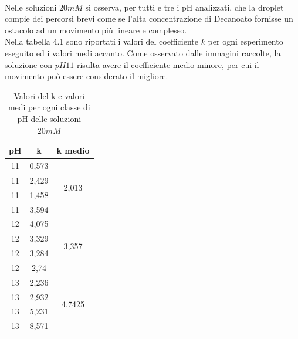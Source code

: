 \\Nelle soluzioni $20mM$ si osserva, per tutti e tre i pH analizzati, che la droplet compie dei percorsi brevi come se l'alta concentrazione di Decanoato fornisse un ostacolo ad un movimento più lineare e complesso. 
\\Nella tabella 4.1 sono riportati i valori del coefficiente $k$ per ogni esperimento eseguito ed i valori medi accanto. Come osservato dalle immagini raccolte, la soluzione con $pH11$ risulta avere il coefficiente medio minore, per cui il movimento può essere considerato il migliore.  
\begin{table}
\caption{Valori del k e valori medi per ogni classe di pH delle soluzioni $20mM$}
\begin{center}
\begin{tabular}{ccc}

\textbf{pH} & \textbf{k} & \textbf{k medio}        \\ \hline
11          & 0,573      & \multirow{4}{*}{2,013}  \\
11          & 2,429      &                         \\
11          & 1,458      &                         \\
11          & 3,594      &                         \\ \hline
12          & 4,075      & \multirow{4}{*}{3,357}  \\
12          & 3,329      &                         \\
12          & 3,284      &                         \\
12          & 2,74       &                         \\ \hline
13          & 2,236      & \multirow{4}{*}{4,7425} \\ 
13          & 2,932      &                         \\ 
13          & 5,231      &                         \\ 
13          & 8,571      &                         \\
\end{tabular}
\end{center}
\end{table}
\pagebreak
